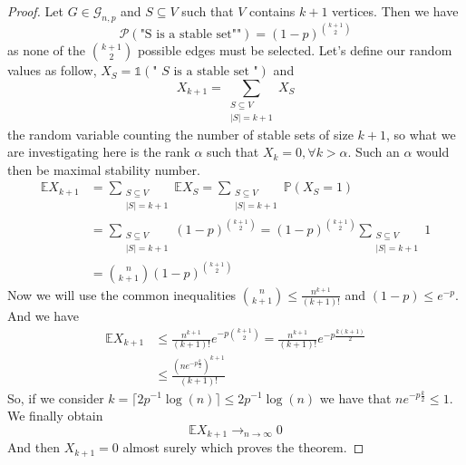 \begin{proof}
	Let $G \in \mathcal{G}_{n,p}$ and $S \subseteq V$ such that $V$ contains $k+1$ vertices.
	Then we have 
	\begin{equation}
		\mathcal{P}(\text{"S is a stable set""}) = (1-p)^{\binom{k+1}{2}  }
	\end{equation}
	as none of the $\binom{k+1}{2}$ possible edges must be selected.
	\newline
	Let's define our random values as follow, $X_S = \mathbb{1}(\text{" $S$ is a stable set "})$ and
	\begin{equation}
		X_{k+1} = \sum_{\substack{ S \subseteq V \\ |S| = k + 1}} X_S
	\end{equation}
	the random variable counting the number of stable sets of size $k+1$, so what we are investigating here is the rank $\alpha$ such that $X_k = 0, \forall k > \alpha$. Such an $\alpha$ would then be maximal stability number.
	\begin{align}
		\mathbb{E}X_{k+1} &= \sum_{\substack{ S \subseteq V \\ |S| = k + 1}} \mathbb{E} X_S 	
				  = \sum_{\substack{ S \subseteq V \\ |S| = k + 1}} \mathbb{P}(X_S = 1)	\\		
		&= \sum_{\substack{ S \subseteq V \\ |S| = k + 1}} (1-p)^{\binom{k+1}{2}  }		
		= (1-p)^{\binom{k+1}{2}} \sum_{\substack{ S \subseteq V \\ |S| = k + 1}} 1 	\\	
		&= \binom{n}{k+1} (1-p)^{\binom{k+1}{2}} 
	\end{align}
	Now we will use the common inequalities $  \binom{n}{k+1} \leq \frac{n^{k+1}}{(k+1)!} $ and $(1-p) \leq e^{-p}$. 
	And we have
	\begin{align}
		\mathbb{E}X_{k+1} 	&\leq  \frac{n^{k+1}}{(k+1)!} e^{-p \binom{k+1}{2}} = \frac{n^{k+1}}{(k+1)!} e^{-p \frac{k(k+1)}{2}}\\
									     &\leq  \frac{(ne^{-p\frac{k}{2}})^{k+1}}{(k+1)!}
	\end{align}
	So, if we consider $k = \lceil 2p^{-1}\log(n)\rceil \leq 2p^{-1}\log(n)$ we have that $ ne^{-p\frac{k}{2}} \leq 1$.
	We finally obtain 
	\begin{equation}
		\mathbb{E} X_{k+1} \longrightarrow_{n \to \infty} 0
	\end{equation}
	And then $X_{k+1} = 0$ almost surely which proves the theorem.

\end{proof}

